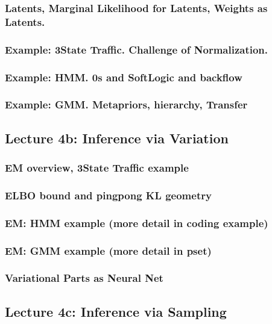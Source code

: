 \documentclass[12pt]{article}
\begin{document}
      \subsubsection*{Latents, Marginal Likelihood for Latents, Weights as Latents.}
      \subsubsection*{Example: 3State Traffic.  Challenge of Normalization.}
      \subsubsection*{Example: HMM.  0s and SoftLogic and backflow}
      \subsubsection*{Example: GMM.  Metapriors, hierarchy, Transfer}
    \newpage

    \subsection*{Lecture 4b: Inference via Variation} %
      \subsubsection*{EM overview, 3State Traffic example}
      \subsubsection*{ELBO bound and pingpong KL geometry}
      \subsubsection*{EM: HMM example (more detail in coding example)}
      \subsubsection*{EM: GMM example (more detail in pset)}
      \subsubsection*{Variational Parts as Neural Net}
    \newpage

    \subsection*{Lecture 4c: Inference via Sampling} %
\end{document}
